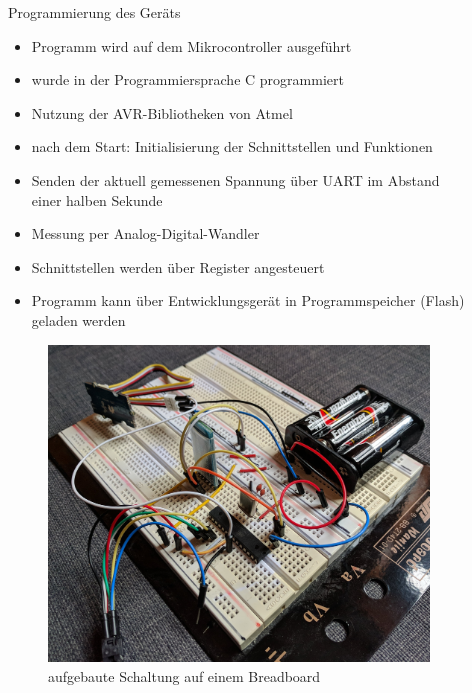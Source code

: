 \documentclass[final,20pt]{beamer}
\newlength{\sepwidth}
\newlength{\colwidth}
\newcommand{\separatorcolumn}{\begin{column}{\sepwidth}\end{column}}
\begin{document}
\begin{frame}[t]
\begin{columns}[t]
\begin{column}{\colwidth}
  \begin{alertblock}{Programmierung des Geräts}
  	\begin{itemize}
  		\item Programm wird auf dem Mikrocontroller ausgeführt
  		\item wurde in der Programmiersprache C programmiert
  		\item Nutzung der AVR-Bibliotheken von Atmel
  		\item nach dem Start: Initialisierung der Schnittstellen und Funktionen
  		\item Senden der aktuell gemessenen Spannung über UART im Abstand einer halben Sekunde
  		\item Messung per Analog-Digital-Wandler
  		\item Schnittstellen werden über Register angesteuert
  		\item Programm kann über Entwicklungsgerät in Programmspeicher (Flash) geladen werden
  	\end{itemize}
	  \begin{figure}[H]
	  	\centering
	  	\includegraphics[width=0.8\colwidth]{pics/mikrocontroller}
	  	\caption{aufgebaute Schaltung auf einem Breadboard}
	  	\label{fig:mcspp}
	  \end{figure}
  \end{alertblock}
\end{column}

\separatorcolumn
\begin{column}{\colwidth}  
	

\end{column}
\end{columns}
\end{frame}
\end{document}
